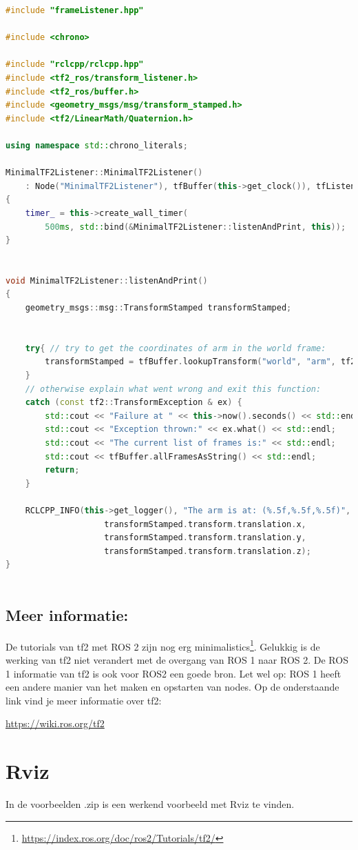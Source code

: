 \begin{lstlisting}[language=C++, caption={frameListener.hpp; De header file van een node met een listener.}, firstnumber=0, label={code:frameListener.cpp}]
#include "frameListener.hpp"

#include <chrono>

#include "rclcpp/rclcpp.hpp"
#include <tf2_ros/transform_listener.h>
#include <tf2_ros/buffer.h>
#include <geometry_msgs/msg/transform_stamped.h>
#include <tf2/LinearMath/Quaternion.h>

using namespace std::chrono_literals;

MinimalTF2Listener::MinimalTF2Listener()
    : Node("MinimalTF2Listener"), tfBuffer(this->get_clock()), tfListener(tfBuffer)
{
    timer_ = this->create_wall_timer(
        500ms, std::bind(&MinimalTF2Listener::listenAndPrint, this));    
}


void MinimalTF2Listener::listenAndPrint()
{
    geometry_msgs::msg::TransformStamped transformStamped;

    
    try{ // try to get the coordinates of arm in the world frame:
        transformStamped = tfBuffer.lookupTransform("world", "arm", tf2::TimePoint());
    }
    // otherwise explain what went wrong and exit this function:
    catch (const tf2::TransformException & ex) {
        std::cout << "Failure at " << this->now().seconds() << std::endl;
        std::cout << "Exception thrown:" << ex.what() << std::endl;
        std::cout << "The current list of frames is:" << std::endl;
        std::cout << tfBuffer.allFramesAsString() << std::endl;
        return;
    }

    RCLCPP_INFO(this->get_logger(), "The arm is at: (%.5f,%.5f,%.5f)", 
                    transformStamped.transform.translation.x,
                    transformStamped.transform.translation.y,
                    transformStamped.transform.translation.z);
}



\end{lstlisting}

\subsection{Meer informatie:}
De tutorials van tf2 met ROS 2 zijn nog erg minimalistics\footnote{\url{https://index.ros.org/doc/ros2/Tutorials/tf2/}}. Gelukkig is de werking van tf2 niet verandert met de overgang van ROS 1 naar ROS 2. De ROS 1 informatie van tf2 is ook voor ROS2 een goede bron. Let wel op: ROS 1 heeft een andere manier van het maken en opstarten van nodes. Op de onderstaande link vind je meer informatie over tf2:

\begin{center}
    \url{https://wiki.ros.org/tf2}
\end{center}


\section{Rviz} \label{sec:rviz}
In de voorbeelden .zip is een werkend voorbeeld met Rviz te vinden.
